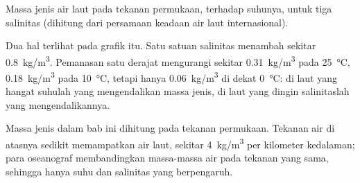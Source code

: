 \begin{omfigure}

{\small Massa jenis air laut pada tekanan permukaan, terhadap suhunya, untuk
tiga salinitas (dihitung dari persamaan keadaan air laut internasional).}
\end{omfigure}

Dua hal terlihat pada grafik itu. Satu satuan salinitas menambah sekitar
\qty{0.8}{kg/m^3}. Pemanasan satu derajat mengurangi sekitar
\qty{0.31}{kg/m^3} pada \qty{25}{\degreeCelsius}, \qty{0.18}{kg/m^3} pada
\qty{10}{\degreeCelsius}, tetapi hanya \qty{0.06}{kg/m^3} di dekat
\qty{0}{\degreeCelsius}: di laut yang hangat suhulah yang mengendalikan massa
jenis, di laut yang dingin salinitaslah yang mengendalikannya.

\begin{remark}
Massa jenis dalam bab ini dihitung pada tekanan permukaan. Tekanan air di
atasnya sedikit memampatkan air laut, sekitar \qty{4}{kg/m^3} per kilometer
kedalaman; para oseanograf membandingkan massa-massa air pada tekanan yang
sama, sehingga hanya suhu dan salinitas yang berpengaruh.
\end{remark}


